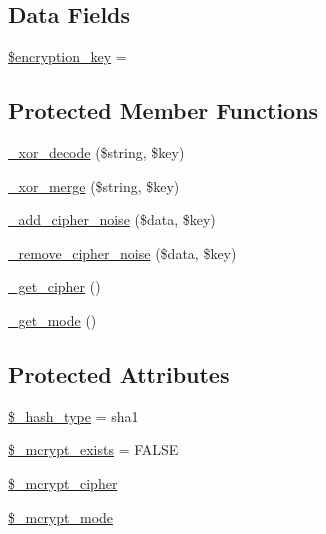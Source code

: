 \subsection*{Data Fields}
\begin{DoxyCompactItemize}
\item 
\hyperlink{class_c_i___encrypt_a35bbf76a5bcca90ca9b39368ed28121c}{\$encryption\+\_\+key} = \textquotesingle{}\textquotesingle{}
\end{DoxyCompactItemize}
\subsection*{Protected Member Functions}
\begin{DoxyCompactItemize}
\item 
\hyperlink{class_c_i___encrypt_aa0cee348c5cef9a3a06c22a92c38fd4f}{\+\_\+xor\+\_\+decode} (\$string, \$key)
\item 
\hyperlink{class_c_i___encrypt_aaf2644aeb5ec418eb4ddc2d70f372ada}{\+\_\+xor\+\_\+merge} (\$string, \$key)
\item 
\hyperlink{class_c_i___encrypt_ada423e99876a54e7bc33afc9899d01a2}{\+\_\+add\+\_\+cipher\+\_\+noise} (\$data, \$key)
\item 
\hyperlink{class_c_i___encrypt_a35c2675b85803d42231d1f8353fa8dac}{\+\_\+remove\+\_\+cipher\+\_\+noise} (\$data, \$key)
\item 
\hyperlink{class_c_i___encrypt_a663ee049f0b7596a0e4925a3eb2db062}{\+\_\+get\+\_\+cipher} ()
\item 
\hyperlink{class_c_i___encrypt_a8c6526d9458754249ee7268ead883a6c}{\+\_\+get\+\_\+mode} ()
\end{DoxyCompactItemize}
\subsection*{Protected Attributes}
\begin{DoxyCompactItemize}
\item 
\hyperlink{class_c_i___encrypt_a04e9d4ea0e45fc04c07aa1e291e17412}{\$\+\_\+hash\+\_\+type} = \textquotesingle{}sha1\textquotesingle{}
\item 
\hyperlink{class_c_i___encrypt_aaf4246798dad057cc4e294706e5e4e37}{\$\+\_\+mcrypt\+\_\+exists} = F\+A\+L\+S\+E
\item 
\hyperlink{class_c_i___encrypt_ab2cdedd99c4818b191c667f5e081a2db}{\$\+\_\+mcrypt\+\_\+cipher}
\item 
\hyperlink{class_c_i___encrypt_ace4d98b5320c7fe75e6a38505abcdb82}{\$\+\_\+mcrypt\+\_\+mode}
\end{DoxyCompactItemize}


